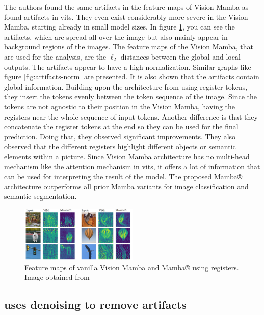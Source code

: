 \documentclass[conference]{IEEEtran}
\begin{document}
  The authors found the same artifacts in the feature maps of Vision Mamba as \citeauthor{registers} \cite{registers} found artifacts in \acp{vit}. They even exist considerably more severe in the Vision Mamba, starting already in small model sizes. In figure \ref{fig:mamba-artifacts}, you can see the artifacts, which are spread all over the image but also mainly appear in background regions of the images. The feature maps of the Vision Mamba, that are used for the analysis, are the $\ell_2$ distances between the global and local outputs. The artifacts appear to have a high normalization. Similar graphs like figure \ref{fig:artifacts-norm} are presented. It is also shown that the artifacts contain global information. Building upon the architecture from \citeauthor{registers} \cite{registers} using register tokens, they insert the tokens evenly between the token sequence of the image. Since the tokens are not agnostic to their position in the Vision Mamba, having the registers near the whole sequence of input tokens. Another difference is that they concatenate the register tokens at the end so they can be used for the final prediction. Doing that, they observed significant improvements. They also observed that the different registers highlight different objects or semantic elements within a picture. Since Vision Mamba architecture has no multi-head mechanism like the attention mechanism in \acp{vit}, it offers a lot of information that can be used for interpreting the result of the model. The proposed Mamba® architecture outperforms all prior Mamba variants for image classification and semantic segmentation. \cite{mamba-needs-registers}

  \begin{figure}
    \centering
    \includegraphics[width=0.5\textwidth]{figures/mamba-artifacts.png}
    \caption{Feature maps of vanilla Vision Mamba \cite{vision-mamba} and Mamba® using registers. Image obtained from \cite{mamba-needs-registers}}
    \label{fig:mamba-artifacts}
  \end{figure}

  \subsection{\citeauthor{denoising} \cite{denoising} uses denoising to remove artifacts}
  \label{sec:buildup:denoising}
\end{document}
